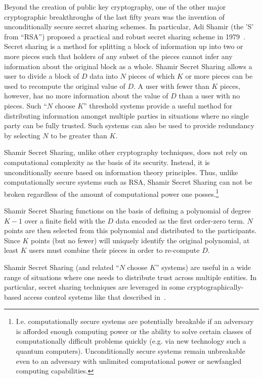 Beyond the creation of public key cryptography, one of the other major
cryptographic breakthroughs of the last fifty years was the invention
of unconditionally secure secret sharing schemes. In particular, Adi
Shamir (the 'S' from ``RSA'') proposed a practical and robust secret
sharing scheme in 1979~\cite{shamir1979}. Secret sharing is a method
for splitting a block of information up into two or more pieces such
that holders of any subset of the pieces cannot infer any information
about the original block as a whole. Shamir Secret Sharing allows a
user to divide a block of $D$ data into $N$ pieces of which $K$ or
more pieces can be used to recompute the original value of $D$. A user
with fewer than $K$ pieces, however, has no more information about the
value of $D$ than a user with no pieces. Such ``$N$ choose $K$''
threshold systems provide a useful method for distributing information
amongst multiple parties in situations where no single party can be
fully trusted. Such systems can also be used to provide redundancy by
selecting $N$ to be greater than $K$.

Shamir Secret Sharing, unlike other cryptography techniques, does not
rely on computational complexity as the basis of its
security. Instead, it is unconditionally secure based on information
theory principles. Thus, unlike computationally secure systems such as
RSA, Shamir Secret Sharing can not be broken regardless of the amount
of computational power one posses.\footnote{ I.e. computationally
  secure systems are potentially breakable if an adversary is afforded
  enough computing power or the ability to solve certain classes of
  computationally difficult problems quickly (e.g. via new technology
  such a quantum computers). Unconditionally secure systems remain
  unbreakable even to an adversary with unlimited computational power
  or newfangled computing capabilities.}

Shamir Secret Sharing functions on the basis of defining a polynomial
of degree $K-1$ over a finite field with the $D$ data encoded as the
first order-zero term. $N$ points are then selected from this
polynomial and distributed to the participants. Since $K$ points (but
no fewer) will uniquely identify the original polynomial, at least $K$
users must combine their pieces in order to re-compute $D$.

Shamir Secret Sharing (and related ``$N$ choose $K$'' systems) are
useful in a wide range of situations where one needs to distribute
trust across multiple entities. In particular, secret sharing
techniques are leveraged in some cryptographically-based access
control systems like that described in~\cite{goyal2006}.

